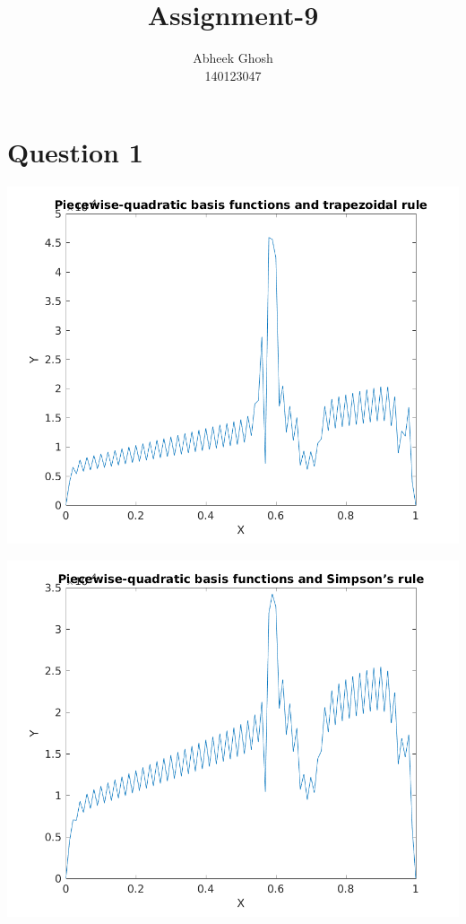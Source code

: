 \documentclass{article}
\begin{document}
	\title{\textbf{Assignment-9}}
	\author{Abheek Ghosh \\ 
		140123047 }
	
	\maketitle

\section{Question 1}

\includegraphics{"q1_1"}
\pagebreak


\includegraphics{"q1_2"}
\pagebreak
\end{document}
